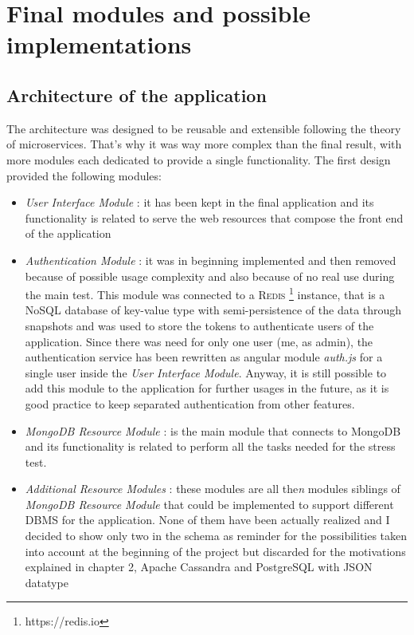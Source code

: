 \section{Final modules and possible implementations}
\label{sec:5}

\subsection{Architecture of the application}
The architecture was designed to be reusable and extensible following the theory of microservices. That’s why it was way more complex than the final result, with more modules each dedicated to provide a single functionality. The first design provided the following modules:
\begin{itemize}
	\item \textit{User Interface Module} : it has been kept in the final application and its functionality is related to serve the web resources that compose the front end of the application
	\item \textit{Authentication Module} : it was in beginning implemented and then removed because of possible usage complexity and also because of no real use during the main test. This module was connected to a \textsc{Redis} \footnote{https://redis.io} instance, that is a NoSQL database of key-value type with semi-persistence of the data through snapshots and was used to store the tokens to authenticate users of the application. Since there was need for only one user (me, as admin), the authentication service has been rewritten as angular module \textit{auth.js} for a single user inside the \textit{User Interface Module}. Anyway, it is still possible to add this module to the application for further usages in the future, as it is good practice to keep separated authentication from other features.
	\item \textit{MongoDB Resource Module} : is the main module that connects to MongoDB and its functionality is related to perform all the tasks needed for the stress test.
	\item \textit{Additional Resource Modules} : these modules are all the\textit{n} modules siblings of \textit{MongoDB Resource Module} that could be implemented to support different DBMS for the application. None of them have been actually realized and I decided to show only two in the schema as reminder for the possibilities taken into account at the beginning of the project but discarded for the motivations explained in chapter 2, Apache Cassandra and PostgreSQL with JSON datatype
\end{itemize}

